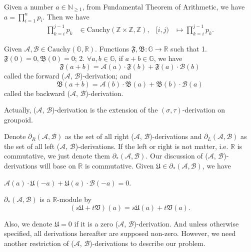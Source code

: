 \begin{example}\label{exa:fundamental-theorem-of-arithmetic-to-cauchy-homo}
    Given a number $a\in\mathbb{N}_{\ge1}$, from Fundamental Theorem of Arithmetic, we have $a = \prod_{i=1}^{n} p_i$. Then we have
    \begin{align*}
        \prod_{k=i}^{j-1}p_k&\in \mathrm{Cauchy}(\mathbb{Z}\times \mathbb{Z}, \mathbb{Z}), & [i, j) &\mapsto \prod_{k=i}^{j-1}p_k.
    \end{align*}
\end{example}
\begin{definition}\label{def:quasi-derivation-on-groupoid}
    Given $\mathcal{A}, \mathcal{B}\in\mathrm{Cauchy}(\mathbb{G},\mathbb{R})$.
    Functions $\mathfrak{F}, \mathfrak{B}: \mathbb{G} \to \mathbb{R}$ such that 1. $\mathfrak{F}(0) = 0, \mathfrak{B}(0) = 0$;  2. $\forall a, b \in \mathbb{G}$, if $a + b \in \mathbb{G}$, we have
    \[ \mathfrak{F}(a+b) = \mathcal{A}(a)\cdot\mathfrak{F}(b) + \mathfrak{F}(a)\cdot\mathcal{B}(b) \]
    called the forward ($\mathcal{A}$, $\mathcal{B}$)-derivation; and
    \[ \mathfrak{B}(a+b) = \mathcal{A}(b)\cdot\mathfrak{B}(a) + \mathfrak{B}(b)\cdot\mathcal{B}(a) \]
    called the backward ($\mathcal{A}$, $\mathcal{B}$)-derivation.
\end{definition}
Actually, ($\mathcal{A}$, $\mathcal{B}$)-derivation is the extension of the $(\sigma, \tau)$-derivation on groupoid.

Denote $\partial_{R}(\mathcal{A}, \mathcal{B})$ as the set of all right ($\mathcal{A}$, $\mathcal{B}$)-derivations and $\partial_{L}(\mathcal{A}, \mathcal{B})$ as the set of all left ($\mathcal{A}$, $\mathcal{B}$)-derivations.
If the left or right is not matter, i.e. $\mathbb{R}$ is commutative, we just denote them $\partial_{*}(\mathcal{A}, \mathcal{B})$.
Our discussion of ($\mathcal{A}$, $\mathcal{B}$)-derivations will base on $\mathbb{R}$ is commutative.
Given $\mathfrak{U} \in \partial_{*}(\mathcal{A}, \mathcal{B})$, we have
\begin{proposition}
    $\mathcal{A}(a)\cdot\mathfrak{U}(-a) + \mathfrak{U}(a)\cdot\mathcal{B}(-a) = 0$.
\end{proposition}
\begin{proposition}
    $\partial_{*}(\mathcal{A}, \mathcal{B})$ is a $\mathbb{R}$-module by
    \[ (s\mathfrak{U} + t\mathfrak{V})(a) = s\mathfrak{U}(a) + t\mathfrak{V}(a). \]
\end{proposition}
Also, we denote $\mathfrak{U} = 0$ if it is a zero ($\mathcal{A}$, $\mathcal{B}$)-derivation.
And unless otherwise specified, all derivations hereafter are supposed non-zero.
However, we need another restriction of ($\mathcal{A}$, $\mathcal{B}$)-derivations to describe our problem.

